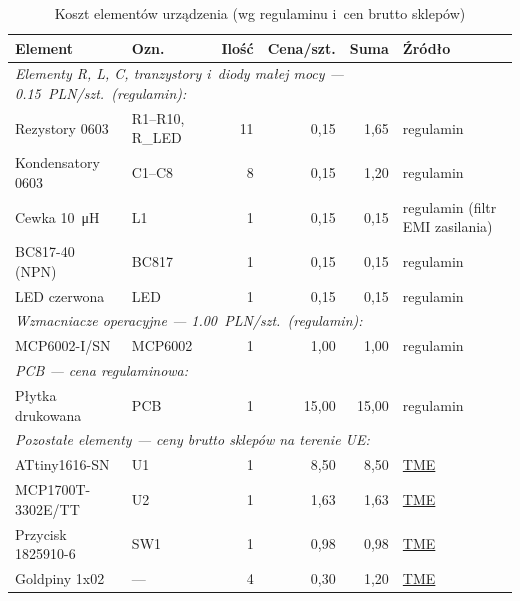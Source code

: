 \documentclass[a4paper,11pt]{article}
\begin{document}
\begin{table}[H]
    \centering
    \caption{Koszt elementów urządzenia (wg regulaminu i~cen brutto sklepów)}
    \label{tab:koszty}
    \begin{tabular}{llrrrl}
        \toprule
        \textbf{Element} & \textbf{Ozn.} & \textbf{Ilość} &
        \textbf{Cena/szt.} & \textbf{Suma} & \textbf{Źródło} \\
        \midrule
        \multicolumn{6}{l}{\textit{Elementy R, L, C, tranzystory i~diody małej mocy --- \SI{0,15}{PLN}/szt.\ (regulamin):}} \\
        \midrule
        Rezystory 0603 & R1--R10, R\_LED & 11 & 0,15 & 1,65 & regulamin \\
        Kondensatory 0603 & C1--C8 & 8 & 0,15 & 1,20 & regulamin \\
        Cewka \SI{10}{\micro\henry} & L1 & 1 & 0,15 & 0,15 & regulamin (filtr EMI zasilania) \\
        BC817-40 (NPN) & BC817 & 1 & 0,15 & 0,15 & regulamin \\
        LED czerwona & LED & 1 & 0,15 & 0,15 & regulamin \\
        \midrule
        \multicolumn{6}{l}{\textit{Wzmacniacze operacyjne --- \SI{1,00}{PLN}/szt.\ (regulamin):}} \\
        \midrule
        MCP6002-I/SN & MCP6002 & 1 & 1,00 & 1,00 & regulamin \\
        \midrule
        \multicolumn{6}{l}{\textit{PCB --- cena regulaminowa:}} \\
        \midrule
        Płytka drukowana & PCB & 1 & 15,00 & 15,00 & regulamin \\
        \midrule
        \multicolumn{6}{l}{\textit{Pozostałe elementy --- ceny brutto sklepów na terenie UE:}} \\
        \midrule
        ATtiny1616-SN & U1 & 1 & 8,50 & 8,50 &
            \href{https://www.tme.eu/pl/details/attiny1616-snr/mikrokontrolery-microchip-avr-8-bit/microchip-technology/}{TME} \\
        MCP1700T-3302E/TT & U2 & 1 & 1,63 & 1,63 &
            \href{https://www.tme.eu/pl/details/mcp1700t-3302e_tt/stabilizatory-ldo-nienastawne/microchip-technology/}{TME} \\
        Przycisk 1825910-6 & SW1 & 1 & 0,98 & 0,98 &
            \href{https://www.tme.eu/pl/details/1825910-6/przelaczniki-tact/te-connectivity/}{TME} \\
        Goldpiny 1x02 & --- & 4 & 0,30 & 1,20 &
            \href{https://www.tme.eu/pl/}{TME} \\

\end{tabular}
\end{table}
\end{document}
